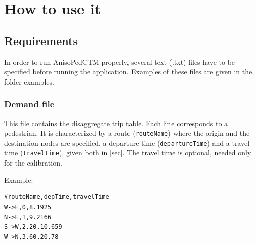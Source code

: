 \documentclass[a4paper,12pt]{article}
\begin{document}
\section{How to use it}
\subsection{Requirements}
In order to run AnisoPedCTM properly, several text (.txt) files have to be specified before running the application. Examples of these files are given in the folder examples.

\subsubsection{Demand file}
This file contains the disaggregate trip table. Each line corresponds to a pedestrian. It is characterized by a route (\verb+routeName+) where the origin and the destination nodes are specified, a departure time (\verb+departureTime+) and a travel time (\verb+travelTime+), given both in [sec]. The travel time is optional, needed only for the calibration.

Example:
\begin{lstlisting}[breaklines]
#routeName,depTime,travelTime
W->E,0,8.1925
N->E,1,9.2166
S->W,2.20,10.659
W->N,3.60,20.78
\end{lstlisting}
\end{document}
